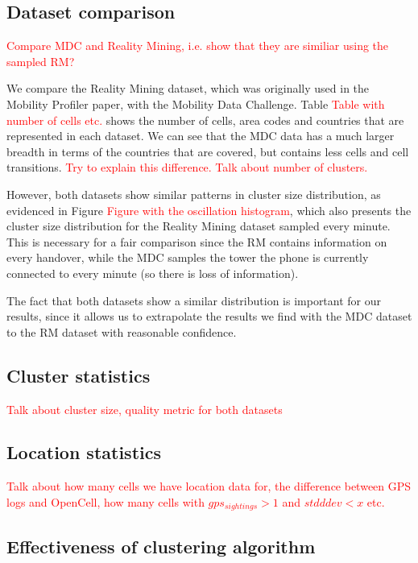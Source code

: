 \documentclass[letterpaper, 11pt, conference]{ieeeconf}
\newcommand{\xxx}[1]{\textcolor{red}{#1}}
\begin{document}
\subsection{Dataset comparison}


\xxx{Compare MDC and Reality Mining, i.e. show that they are similiar using the sampled RM?}

We compare the Reality Mining dataset, which was originally used in the Mobility Profiler paper, with the Mobility Data Challenge. Table \xxx{Table with number of cells etc.} shows the number of cells, area codes and countries that are represented in each dataset. We can see that the MDC data has a much larger breadth in terms of the countries that are covered, but contains less cells and cell transitions. \xxx{Try to explain this difference. Talk about number of clusters.}

However, both datasets show similar patterns in cluster size distribution, as evidenced in Figure \xxx{Figure with the oscillation histogram}, which also presents the cluster size distribution for the Reality Mining dataset sampled every minute. This is necessary for a fair comparison since the RM contains information on every handover, while the MDC samples the tower the phone is currently connected to every minute (so there is loss of information).

The fact that both datasets show a similar distribution is important for our results, since it allows us to extrapolate the results we find with the MDC dataset to the RM dataset with reasonable confidence.

\subsection{Cluster statistics}

\xxx{Talk about cluster size, quality metric for both datasets}

\subsection{Location statistics}

\xxx{Talk about how many cells we have location data for, the difference between GPS logs and OpenCell, how many cells with $gps_{sightings} > 1$ and $stdddev < x$ etc.}

\subsection{Effectiveness of clustering algorithm}
\end{document}
